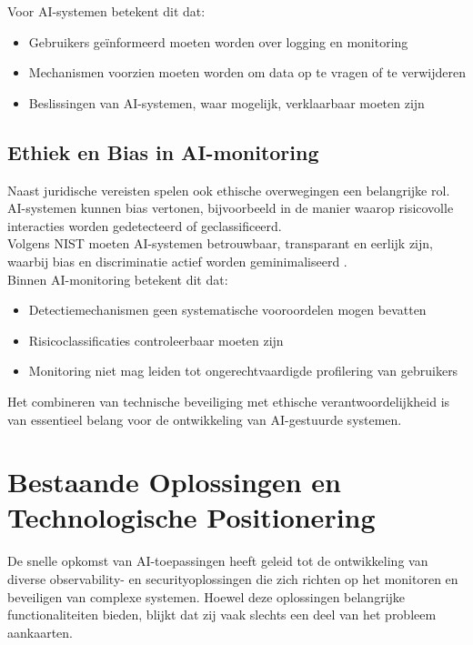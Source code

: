 Voor AI-systemen betekent dit dat:

\begin{itemize}
    \item Gebruikers geïnformeerd moeten worden over logging en monitoring
    \item Mechanismen voorzien moeten worden om data op te vragen of te verwijderen
    \item Beslissingen van AI-systemen, waar mogelijk, verklaarbaar moeten zijn
\end{itemize}

\subsection{Ethiek en Bias in AI-monitoring}

Naast juridische vereisten spelen ook ethische overwegingen een belangrijke rol. AI-systemen kunnen bias vertonen, bijvoorbeeld in de manier waarop risicovolle interacties worden gedetecteerd of geclassificeerd.\\

Volgens NIST moeten AI-systemen betrouwbaar, transparant en eerlijk zijn, waarbij bias en discriminatie actief worden geminimaliseerd \autocite{nistai2023}.\\

Binnen AI-monitoring betekent dit dat:

\begin{itemize}
    \item Detectiemechanismen geen systematische vooroordelen mogen bevatten
    \item Risicoclassificaties controleerbaar moeten zijn
    \item Monitoring niet mag leiden tot ongerechtvaardigde profilering van gebruikers
\end{itemize}

Het combineren van technische beveiliging met ethische verantwoordelijkheid is van essentieel belang voor de ontwikkeling van AI-gestuurde systemen.






\section{Bestaande Oplossingen en Technologische Positionering}

De snelle opkomst van AI-toepassingen heeft geleid tot de ontwikkeling van diverse observability- en securityoplossingen die zich richten op het monitoren en beveiligen van complexe systemen. Hoewel deze oplossingen belangrijke functionaliteiten bieden, blijkt dat zij vaak slechts een deel van het probleem aankaarten. 

